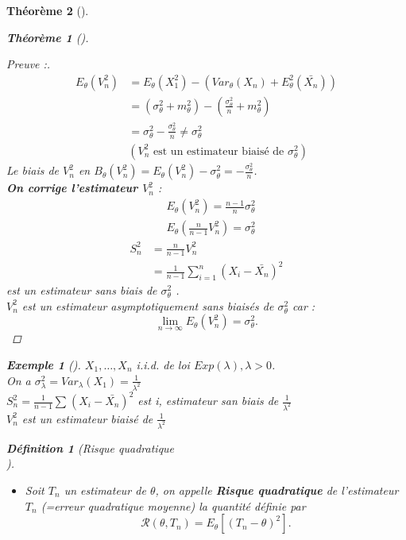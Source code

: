 \documentclass{article}
\theoremstyle{plain}%
\newtheorem{thm}{Théorème}[section]
\theoremstyle{definition}
\newtheorem{defn}{Définition}[section]
\newtheorem{exmp}{Exemple}[section]
\theoremstyle{remark}
\begin{document}
\begin{thm}[]
\begin{thm}[]
\begin{proof}[Preuve :]
\begin{align*}
                E_\theta (V_n^2) &= E_\theta (X_1^2) - (Var_\theta (X_n) + E_\theta ^2 (\bar{X_n})) \\ 
                    &= (\sigma _\theta ^2 + m_\theta ^2) - (\frac{\sigma _\theta ^2}{n} + m_\theta ^2) \\
                    &= \sigma _\theta ^2 - \frac{\sigma _\theta ^2}{n} \neq \sigma _\theta ^2 \\
                    & (V_n^2 \text{ est un estimateur biaisé de } \sigma _\theta ^2)
            \end{align*}
            Le biais de $ V_n^2 $ en $ B_\theta (V_n^2) = E_\theta (V_n^2) - \sigma _\theta ^2 = - \frac{\sigma _\theta ^2}{n}$. \\
            
            \textbf{On corrige l'estimateur $ V_n^2 $ } : \begin{align*}
                & E_\theta (V_n^2) = \frac{n-1}{n} \sigma _\theta ^2 \\
                & E_\theta (\frac{n}{n-1} V_n^2) = \sigma _\theta ^2
            \end{align*}
            \begin{align*}
                S_n^2 &= \frac{n}{n-1}V_n^2 \\
                    &= \frac{1}{n-1} \sum_{i=1}^{n}(X_i-\bar{X_n})^2
            \end{align*}
            est un estimateur sans biais de $ \sigma _\theta ^2 $ . \\
            $ V_n^2 $ est un estimateur asymptotiquement sans biaisés de $ \sigma _\theta ^2 $ car : 
            \[
                \lim_{n \to \infty} E_\theta (V_n^2) = \sigma _\theta ^2
            .\]
        \end{proof}
        \begin{exmp}[]
            $ X_1, \dots, X_n $ i.i.d. de loi $ Exp(\lambda ), \lambda > 0 $. \\
            On a $ \sigma _\lambda ^2 = Var_\lambda (X_1) = \frac{1}{\lambda ^2} $\\
            $ S_n^2 = \frac{1}{n-1}\sum_{}^{}(X_i - \bar{X_n})^2 $ est i, estimateur san biais de $ \frac{1}{\lambda ^2} $ \\
            $ V_n^2 $ est un estimateur biaisé de $\frac{1}{\lambda ^2}$  
        \end{exmp}

        \begin{defn}[Risque quadratique \\]
            \begin{itemize}
                \item Soit $ T_n $ un estimateur de $ \theta  $, on appelle \textbf{Risque quadratique} de l'estimateur $ T_n $ (=erreur quadratique moyenne) la quantité définie par 
                \[
                    \mathcal{R}(\theta , T_n) = E_\theta [(T_n - \theta )^2]
                .\]


\end{itemize}
\end{defn}
\end{thm}
\end{thm}
\end{document}

